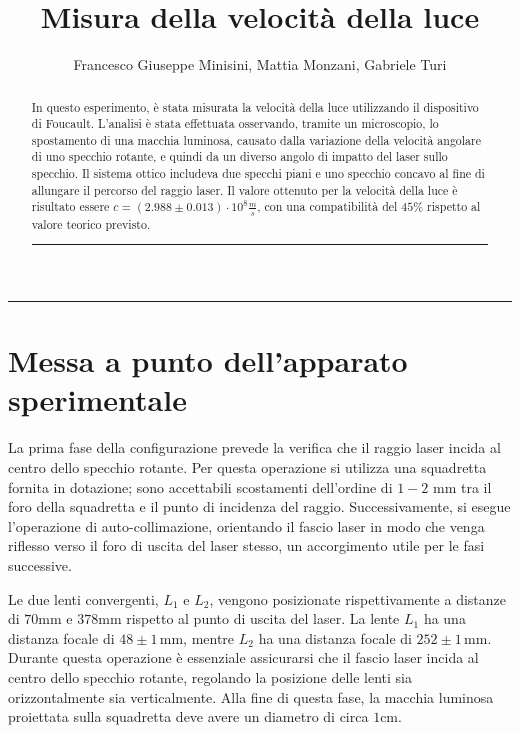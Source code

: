 \documentclass{article}
\title{ Misura della velocità della luce}
\author{Francesco Giuseppe Minisini, Mattia Monzani, Gabriele Turi}
\begin{document}
\maketitle
\hrule
\vspace{9pt}
\begin{abstract}
    \noindent

In questo esperimento, è stata misurata la velocità della luce utilizzando il dispositivo di Foucault. L'analisi è stata effettuata osservando, tramite un microscopio, lo spostamento di una macchia luminosa, causato dalla variazione della velocità angolare di uno specchio rotante, e quindi da un diverso angolo di impatto del laser sullo specchio. Il sistema ottico includeva due specchi piani e uno specchio concavo al fine di allungare il percorso del raggio laser. Il valore ottenuto per la velocità della luce è risultato essere \(c=(2.988\pm0.013)\cdot10^8\frac{m}{s}\), con una compatibilità del \(45\%\) rispetto al valore teorico previsto.
\vspace{20pt}
\hrule
\end{abstract}
\vspace{2 pt}

\section{Messa a punto dell'apparato sperimentale}

La prima fase della configurazione prevede la verifica che il raggio laser incida al centro dello specchio rotante. Per questa operazione si utilizza una squadretta fornita in dotazione; sono accettabili scostamenti dell’ordine di \(1-2 \text{ mm}\) tra il foro della squadretta e il punto di incidenza del raggio. Successivamente, si esegue l’operazione di auto-collimazione, orientando il fascio laser in modo che venga riflesso verso il foro di uscita del laser stesso, un accorgimento utile per le fasi successive.

Le due lenti convergenti, \( L_1 \) e \( L_2 \), vengono posizionate rispettivamente a distanze di \(70 \text{mm}\) e \(378 \text{mm}\) rispetto al punto di uscita del laser. La lente \( L_1 \) ha una distanza focale di \( 48 \pm 1 \, \text{mm} \), mentre \( L_2 \) ha una distanza focale di \( 252 \pm 1 \, \text{mm} \). Durante questa operazione è essenziale assicurarsi che il fascio laser incida al centro dello specchio rotante, regolando la posizione delle lenti sia orizzontalmente sia verticalmente. Alla fine di questa fase, la macchia luminosa proiettata sulla squadretta deve avere un diametro di circa \(1\text{cm}\).
\end{document}
